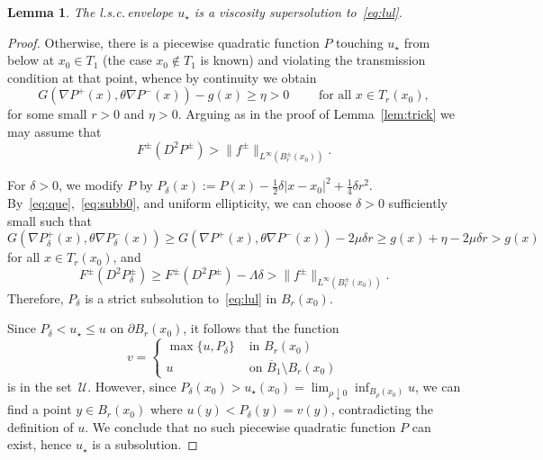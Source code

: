 \documentclass[letter,11pt]{amsart}
\newcommand{\lsc}{l.s.c.\,}
\newcommand{\subsol}{\mathcal{U}}
\newtheorem{lem}[thm]{Lemma}
\theoremstyle{definition}
\numberwithin{equation}{section}
\begin{document}
\begin{lem}
\label{lem:sup}
The \lsc envelope $u_{\star}$ is a viscosity supersolution to~\eqref{eq:lul}.
\end{lem}
\begin{proof}
Otherwise, there is a piecewise quadratic function $P$ touching $u_{\star}$ from below at $x_0 \in T_1$ (the case $x_0 \notin T_1$ is known) and violating the transmission condition at that point, whence by continuity we obtain
\begin{equation}
\label{eq:que}
G(\nabla P^{+}(x), \theta \nabla P^{-}(x))  - g(x) \geq \eta > 0 \qquad \text{ for all } x \in T_{r}(x_0),
\end{equation}
for some small $r > 0$ and $\eta > 0$.
Arguing as in the proof of Lemma~\ref{lem:trick} we may assume that
\begin{equation}
\label{eq:subb0}
F^{\pm}(D^2 P^{\pm}) >  \|f^{\pm}\|_{L^{\infty}(B^{\pm}_{r}(x_0))}.
\end{equation}

\medskip

For $\delta > 0$, we modify $P$ by $P_{\delta}(x) := P(x) - \frac{1}{2}\delta |x-x_0|^2 + \frac{1}{4}\delta r^2$.
By~\eqref{eq:que},~\eqref{eq:subb0}, and uniform ellipticity, we can choose $\delta> 0$ sufficiently small such that
\[
G(\nabla P_{\delta}^{+}(x), \theta \nabla P_{\delta}^{-}(x)) 
\geq G(\nabla P^{+}(x), \theta \nabla P^{-}(x)) -2 \mu \delta r 
\geq g(x) + \eta -2 \mu \delta r
> g(x)
\]
for all $x \in T_r(x_0)$, and
\[
F^{\pm}(D^2 P^{\pm}_{\delta}) 
\geq F^{\pm}(D^2 P^{\pm}) - \Lambda \delta 
> \|f^{\pm}\|_{L^{\infty}(B^{\pm}_{r}(x_0))}.
\]
Therefore, $P_{\delta}$ is a strict subsolution to~\eqref{eq:lul} in $B_{r}(x_0)$.

\medskip

Since $P_{\delta} < u_{\star} \leq u$ on $\partial B_r(x_0)$, it follows that the function
\[
v = \begin{cases}
\max\{u, P_{\delta}\} & \text{ in } B_r(x_0)\\
u & \text{ on } \overline{B}_1 \setminus B_r(x_0)
\end{cases}
\]
is in the set~$\subsol$.
However, since $P_{\delta}(x_0) > u_{\star}(x_0) = \lim_{\rho\downarrow 0} \inf_{B_\rho(x_0)} u$, we can find a point $y \in B_r(x_0)$ where $u(y) < P_{\delta}(y) = v(y)$, contradicting the definition of $u$.
We conclude that no such piecewise quadratic function $P$ can exist, hence $u_{\star}$ is a subsolution.
\end{proof}
\end{document}
